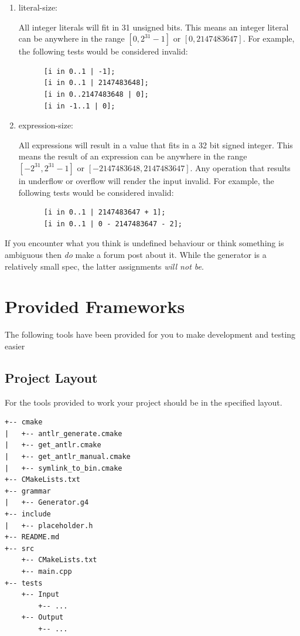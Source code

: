 \documentclass{article}
\newcommand{\assertiondest}[1]{\hypertarget{#1}{#1:}}
\begin{document}
\begin{enumerate}
\begin{lstlisting}
      [i in -2..-1 | i];
    \end{lstlisting}
  \item
    \assertiondest{literal-size}
    All integer literals will fit in 31 unsigned bits. This means an integer literal can be
    anywhere in the range $[0, 2^{31} - 1]$ or $[0, 2147483647]$. For example, the following tests
    would be considered invalid:
    \begin{lstlisting}
      [i in 0..1 | -1];
      [i in 0..1 | 2147483648];
      [i in 0..2147483648 | 0];
      [i in -1..1 | 0];
    \end{lstlisting}
  \item
    \assertiondest{expression-size}
    All expressions will result in a value that fits in a 32 bit signed integer. This means the
    result of an expression can be anywhere in the range $[-2^{31}, 2^{31} - 1]$ or $[-2147483648,
    2147483647]$. Any operation that results in underflow or overflow will render the input
    invalid. For example, the following tests would be considered invalid:
    \begin{lstlisting}
      [i in 0..1 | 2147483647 + 1];
      [i in 0..1 | 0 - 2147483647 - 2];
    \end{lstlisting}
\end{enumerate}
If you encounter what you think is undefined behaviour or think something is ambiguous then
\textit{do} make a forum post about it. While the generator is a relatively small spec,
the latter assignments \textit{will not be}.

\section{Provided Frameworks}

The following tools have been provided for you to make development and testing easier

\subsection{Project Layout}
For the tools provided to work your project should be in the specified layout.

\begin{lstlisting}
+-- cmake
|   +-- antlr_generate.cmake
|   +-- get_antlr.cmake
|   +-- get_antlr_manual.cmake
|   +-- symlink_to_bin.cmake
+-- CMakeLists.txt
+-- grammar
|   +-- Generator.g4
+-- include
|   +-- placeholder.h
+-- README.md
+-- src
    +-- CMakeLists.txt
    +-- main.cpp
+-- tests
    +-- Input
        +-- ...
    +-- Output
        +-- ...
\end{lstlisting}
\end{document}
